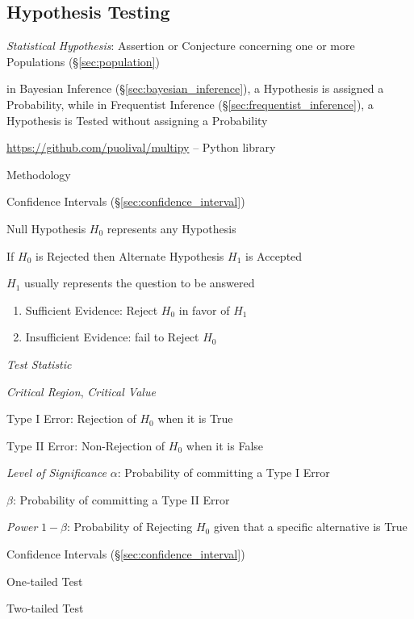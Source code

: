 \subsection{Hypothesis Testing}\label{sec:hypothesis_testing}

\emph{Statistical Hypothesis}: Assertion or Conjecture concerning one or more
Populations (\S\ref{sec:population})

in Bayesian Inference (\S\ref{sec:bayesian_inference}), a Hypothesis is assigned
a Probability, while in Frequentist Inference
(\S\ref{sec:frequentist_inference}), a Hypothesis is Tested without assigning a
Probability

\url{https://github.com/puolival/multipy} -- Python library

Methodology

Confidence Intervals (\S\ref{sec:confidence_interval})

Null Hypothesis $H_0$ represents any Hypothesis

If $H_0$ is Rejected then Alternate Hypothesis $H_1$ is Accepted

$H_1$ usually represents the question to be answered

\begin{enumerate}
  \item Sufficient Evidence: Reject $H_0$ in favor of $H_1$
  \item Insufficient Evidence: fail to Reject $H_0$
\end{enumerate}

\emph{Test Statistic}

\emph{Critical Region}, \emph{Critical Value}

Type I Error: Rejection of $H_0$ when it is True

Type II Error: Non-Rejection of $H_0$ when it is False

\emph{Level of Significance} $\alpha$: Probability of committing a
Type I Error

$\beta$: Probability of committing a Type II Error

\emph{Power} $1 - \beta$: Probability of Rejecting $H_0$ given that a
specific alternative is True

Confidence Intervals (\S\ref{sec:confidence_interval})

One-tailed Test

Two-tailed Test

